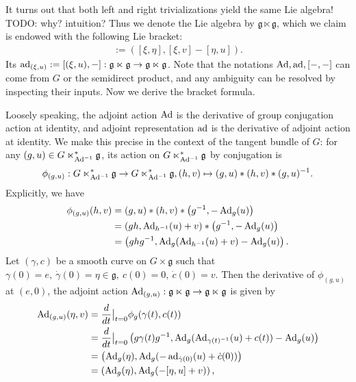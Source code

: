 \documentclass[12pt,class=article,crop=false]{standalone}
\begin{document}
It turns out that both left and right trivializations yield the same Lie algebra! TODO: why? intuition? Thus we denote the Lie algebra by $ \mathfrak{g} \ltimes \mathfrak{g} $, which we claim is endowed with the following Lie bracket:
\begin{align*}
	[(\xi, u), (\eta,v)] := \left( [\xi, \eta], [\xi,v ] - [\eta, u] \right) .
\end{align*}
Its  $ \operatorname{ad}_{ (\xi,u)} := [(\xi,u), -] : \mathfrak{g} \ltimes \mathfrak{g} \to \mathfrak{g} \ltimes \mathfrak{g} $. 
Note that the notations $ \operatorname{Ad}, \operatorname{ad}, [ -, - ] $ can come from $ G$ or the semidirect product, and any ambiguity can be resolved by inspecting their inputs. Now we derive the bracket formula.

Loosely speaking, the adjoint action $ \operatorname{Ad}$ is the derivative of group conjugation action at identity, and adjoint representation $ \operatorname{ad}$ is the derivative of adjoint action at identity. We make this precise in the context of the tangent bundle of $ G$: for any $ (g,u) \in G \ltimes_{\operatorname{Ad}^{-1}}^* \mathfrak{g} $, its action on $ G \ltimes_{\operatorname{Ad}^{-1}}^*  \mathfrak{g} $ by conjugation is
\begin{align*}
	\phi_{(g,u)} : G \ltimes_{\operatorname{Ad}^{-1}}^* \mathfrak{g}  \to G \ltimes_{\operatorname{Ad}^{-1}}^* \mathfrak{g} , (h,v) \mapsto (g,u)*(h,v)*(g,u)^{-1}.
\end{align*}
Explicitly, we have
\begin{align*}
	\phi_{(g,u)} (h,v) &= (g,u)*(h,v)*\left( g^{-1}, - \operatorname{Ad}_{ g}( u) \right)  \\
	&= (gh, \operatorname{Ad}_{ h^{-1}}( u) + v) * \left( g^{-1}, - \operatorname{Ad}_{ g}( u) \right)  \\
	&= \left( ghg^{-1}, \operatorname{Ad}_{ g}( \operatorname{Ad}_{ h^{-1}}( u) + v) - \operatorname{Ad}_{ g}( u) \right)  .
\end{align*}
Let $ (\gamma, c)$ be a smooth curve on $ G \times  \mathfrak{g} $ such that $ \gamma(0) = e,\ \dot{ \gamma}(0) = \eta \in \mathfrak{g},\ c(0) = 0,\ \dot{c}(0) = v$. Then the derivative of $ \phi_{(g,u)}$ at $ (e,0)$, the adjoint action $ \operatorname{Ad}_{(g,u)} : \mathfrak{g} \ltimes  \mathfrak{g}  \to \mathfrak{g}\ltimes  \mathfrak{g} $ is given by
 \begin{align*}
	 \operatorname{Ad}_{ (g,u)}(\eta, v ) &= \frac{d}{dt}\big|_{t= 0} \phi_g ( \gamma(t), c(t)) \\
				&= \frac{d}{dt}\big|_{t= 0} \left( g \gamma(t) g^{-1}, \operatorname{Ad}_{ g}( \operatorname{Ad}_{ \gamma(t)^{-1}}( u) + c(t)) - \operatorname{Ad}_{ g}( u) \right)  \\ 
						     &= \left( \operatorname{Ad}_{ g}( \eta), \operatorname{Ad}_{ g}(- \operatorname{ad}_{\dot{ \gamma}(0)} (u) + \dot{c}(0) ) \right)  \\
						     &= \left( \operatorname{Ad}_{ g}( \eta), \operatorname{Ad}_{ g}( -[ \eta, u] + v) \right)  ,
\end{align*}
\end{document}
